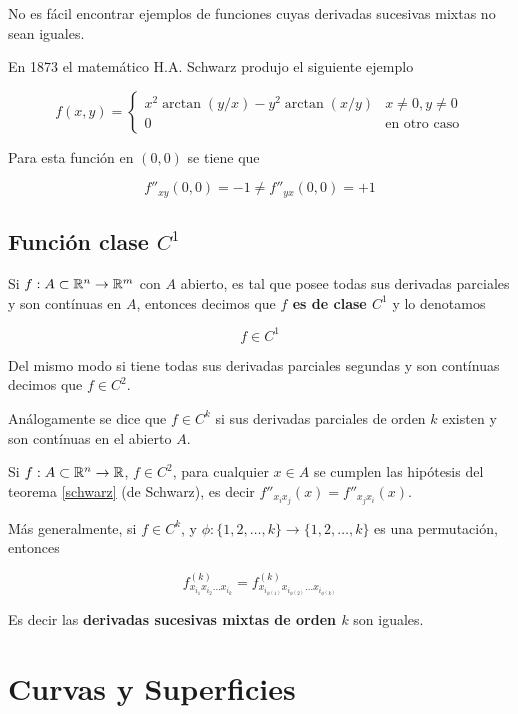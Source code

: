 No es fácil encontrar ejemplos de funciones cuyas derivadas sucesivas mixtas no sean iguales.

En 1873 el matemático H.A. Schwarz produjo el siguiente ejemplo

$$ f(x,y) = \begin{cases} x^2 \arctan(y/x) - y^2 \arctan(x/y) & x \neq 0, y \neq 0 \\ 0 & \textrm{en otro caso} \end{cases} $$

Para esta función en $(0,0)$ se tiene que

$$ f''_{xy}(0,0) = -1 \neq f''_{yx}(0,0) = +1 $$

\subsection{Función clase $C^1$}

\begin{definition}[$C^k$]
Si $ f : A \subset \mathbb{R}^n \to \mathbb{R}^m$ con $A$ abierto, es tal que posee todas sus derivadas parciales y son contínuas en $ A$, entonces decimos que \textbf{$f$ es de clase $ C^1$} y lo denotamos 

$$ f \in C^1 $$

Del mismo modo si tiene todas sus derivadas parciales segundas y son contínuas decimos que $ f \in C^2$.

Análogamente se dice que $f \in C^k$ si sus derivadas parciales de orden $k$ existen y son contínuas en el abierto $A$. 
\end{definition}

\begin{observation}
Si $f : A \subset \mathbb{R}^n \to \mathbb{R}$, $f \in C^2$, para cualquier $x \in A$ se cumplen las hipótesis del teorema \ref{schwarz} (de Schwarz), es decir  $ f''_{x_i x_j}(x) = f''_{x_j x_i}(x)$.

Más generalmente, si $f \in C^k$, y $\phi : \{1,2, \ldots, k\} \to \{1, 2, \ldots, k\}$ es una permutación, entonces 

$$f^{(k)}_{x_{i_1} x_{i_2} \ldots x_{i_k}} = f^{(k)}_{x_{i_{\phi(1)}} x_{i_{\phi(2)}} \ldots x_{i_{\phi(k)}}}$$

Es decir las \textbf{derivadas sucesivas mixtas de orden $k$} son iguales.
\end{observation}

\section{Curvas y Superficies}

